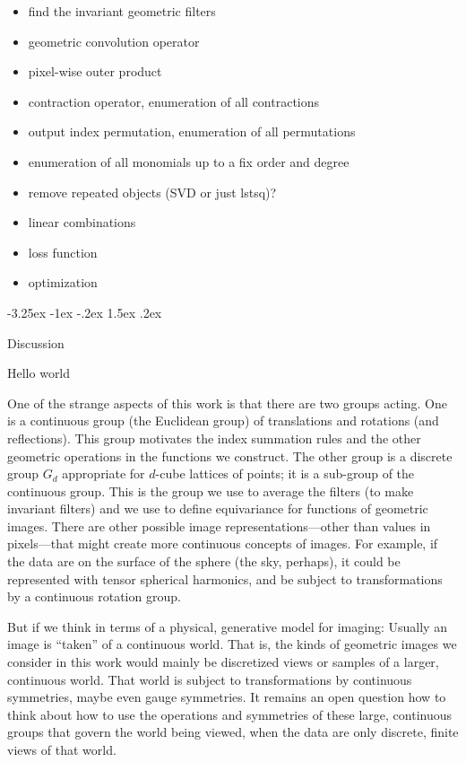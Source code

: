 \documentclass{article}
\makeatletter
\theoremstyle{plain}
\renewcommand\section{\@startsection {section}{1}{\z@}%
  {-3.25ex \@plus -1ex \@minus -.2ex}%
  {1.5ex \@plus .2ex}%
  {\raggedright\normalfont\large\bfseries}}%
\makeatother
\begin{document}
\begin{itemize}
    \item find the invariant geometric filters
    \item geometric convolution operator
    \item pixel-wise outer product
    \item contraction operator, enumeration of all contractions
    \item output index permutation, enumeration of all permutations
    \item enumeration of all monomials up to a fix order and degree 
    \item remove repeated objects (SVD or just lstsq)?
    \item linear combinations 
    \item loss function
    \item optimization
\end{itemize}


\section{Discussion}\label{sec:discussion}

Hello world

One of the strange aspects of this work is that there are two groups acting.
One is a continuous group (the Euclidean group) of translations and rotations (and reflections).
This group motivates the index summation rules and the other geometric operations in the functions we construct.
The other group is a discrete group $G_d$ appropriate for $d$-cube lattices of points; it is a sub-group of the continuous group.
This is the group we use to average the filters (to make invariant filters) and we use to define equivariance for functions of geometric images.
There are other possible image representations---other than values in pixels---that might create more continuous concepts of images.
For example, if the data are on the surface of the sphere (the sky, perhaps), it could be represented with tensor spherical harmonics, and be subject to transformations by a continuous rotation group.

But if we think in terms of a physical, generative model for imaging: Usually an image is ``taken'' of a continuous world.
That is, the kinds of geometric images we consider in this work would mainly be discretized views or samples of a larger, continuous world.
That world is subject to transformations by continuous symmetries, maybe even gauge symmetries.
It remains an open question how to think about how to use the operations and symmetries of these large, continuous groups that govern the world being viewed, when the data are only discrete, finite views of that world.
\end{document}
